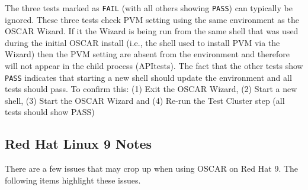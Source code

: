 \begin{itemize}
  The three tests marked as {\tt FAIL} (with all others showing {\tt PASS})
  can typically be ignored.  These three tests check PVM setting using the
  same environment as the OSCAR Wizard.  If it the Wizard is being run from
  the same shell that was used during the initial OSCAR install (i.e., the
  shell used to install PVM via the Wizard) then the PVM setting are absent
  from the environment and therefore will not appear in the child process
  (APItests).  The fact that the other tests show {\tt PASS} indicates that
  starting a new shell should update the environment and all tests should
  pass.  To confirm this:
  (1) Exit the OSCAR Wizard, (2) Start a new shell,
  (3) Start the OSCAR Wizard and (4) Re-run the Test Cluster step
  (all tests should show PASS)


\end{itemize}


\subsection{Red Hat Linux 9 Notes}
\label{subsec:rh90notes}

There are a few issues that may crop up when using OSCAR on Red Hat 9.
The following items highlight these issues.

